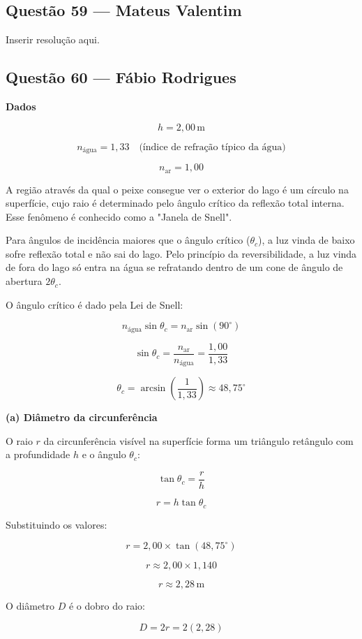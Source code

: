 \documentclass[12pt,a4paper]{article}
\begin{document}
\subsection{Questão 59 — Mateus Valentim}
Inserir resolução aqui.

\subsection{Questão 60 — Fábio Rodrigues}
\textbf{Dados}

\[
h = 2,00\,\text{m}
\]

\[
n_{\text{água}} = 1,33 \quad \text{(índice de refração típico da água)}
\]

\[
n_{\text{ar}} = 1,00
\]

A região através da qual o peixe consegue ver o exterior do lago é um círculo na superfície, cujo raio é determinado pelo ângulo crítico da reflexão total interna. Esse fenômeno é conhecido como a "Janela de Snell".

Para ângulos de incidência maiores que o ângulo crítico (\(\theta_c\)), a luz vinda de baixo sofre reflexão total e não sai do lago. Pelo princípio da reversibilidade, a luz vinda de fora do lago só entra na água se refratando dentro de um cone de ângulo de abertura \(2\theta_c\).

O ângulo crítico é dado pela Lei de Snell:

\[
n_{\text{água}} \sin \theta_c = n_{\text{ar}} \sin(90^\circ)
\]

\[
\sin \theta_c = \frac{n_{\text{ar}}}{n_{\text{água}}} = \frac{1,00}{1,33}
\]

\[
\theta_c = \arcsin\left(\frac{1}{1,33}\right) \approx 48,75^\circ
\]

\textbf{(a) Diâmetro da circunferência}

O raio \(r\) da circunferência visível na superfície forma um triângulo retângulo com a profundidade \(h\) e o ângulo \(\theta_c\):

\[
\tan \theta_c = \frac{r}{h}
\]

\[
r = h \tan \theta_c
\]

Substituindo os valores:

\[
r = 2,00 \times \tan(48,75^\circ)
\]

\[
r \approx 2,00 \times 1,140
\]

\[
r \approx 2,28\,\text{m}
\]

O diâmetro \(D\) é o dobro do raio:

\[
D = 2r = 2(2,28)
\]
\end{document}
